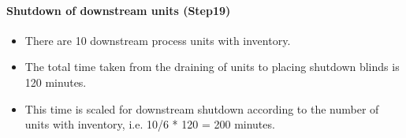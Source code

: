 \paragraph{Shutdown of downstream units (Step19)}
    \begin{itemize}
        \item There are 10 downstream process units with inventory.
        \item The total time taken from the draining of units to placing shutdown blinds is 120 minutes.
        \item This time is scaled for downstream shutdown according to the number of units with inventory, i.e. 10/6 * 120 = 200 minutes.
    \end{itemize}